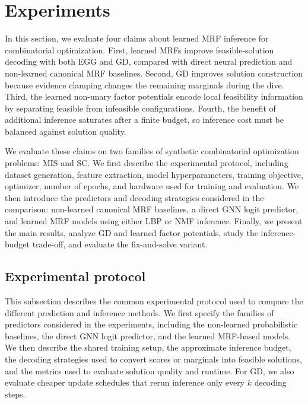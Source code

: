 

\section{Experiments}
\label{sec:chapter_3_experiments}
In this section, we evaluate four claims about learned MRF inference for combinatorial optimization. First, learned MRFs improve feasible-solution decoding with both EGG and GD, compared with direct neural prediction and non-learned canonical MRF baselines. Second, GD improves solution construction because evidence clamping changes the remaining marginals during the dive. Third, the learned non-unary factor potentials encode local feasibility information by separating feasible from infeasible configurations. Fourth, the benefit of additional inference saturates after a finite budget, so inference cost must be balanced against solution quality.

We evaluate these claims on two families of synthetic combinatorial optimization problems: MIS and SC. We first describe the experimental protocol, including dataset generation, feature extraction, model hyperparameters, training objective, optimizer, number of epochs, and hardware used for training and evaluation. We then introduce the predictors and decoding strategies considered in the comparison: non-learned canonical MRF baselines, a direct GNN logit predictor, and learned MRF models using either LBP or NMF inference. Finally, we present the main results, analyze GD and learned factor potentials, study the inference-budget trade-off, and evaluate the fix-and-solve variant.

\subsection{Experimental protocol}
This subsection describes the common experimental protocol used to compare the different prediction and inference methods. We first specify the families of predictors considered in the experiments, including the non-learned probabilistic baselines, the direct GNN logit predictor, and the learned MRF-based models. We then describe the shared training setup, the approximate inference budget, the decoding strategies used to convert scores or marginals into feasible solutions, and the metrics used to evaluate solution quality and runtime. For GD, we also evaluate cheaper update schedules that rerun inference only every $k$ decoding steps.

